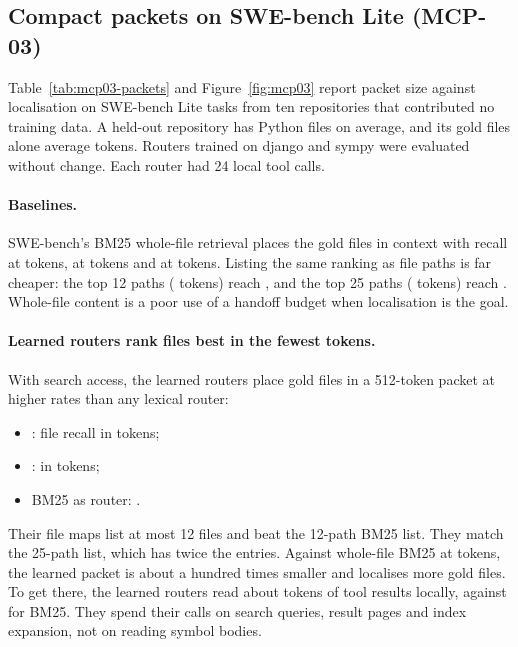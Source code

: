 \subsection{Compact packets on SWE-bench Lite (MCP-03)}
Table~\ref{tab:mcp03-packets} and Figure~\ref{fig:mcp03} report packet size against localisation on
\McpThreeInstances{} SWE-bench Lite tasks from ten repositories that contributed no training data. A held-out
repository has \RepoPythonFiles{} Python files on average, and its gold files alone average \GoldFilesTokens{} tokens.
Routers trained on django and sympy were evaluated without change. Each router had 24 local tool calls.

\paragraph{Baselines.} SWE-bench's BM25 whole-file retrieval places the gold files in context with recall
\BmFilesRecallTwo{} at \BmFilesTokensTwo{} tokens, \BmFilesRecallThirteen{} at \BmFilesTokensThirteen{} tokens and
\BmFilesRecallTwentySeven{} at \BmFilesTokensTwentySeven{} tokens. Listing the same ranking as file paths is far
cheaper: the top 12 paths (\BmMapTokensTwelve{} tokens) reach \BmMapRecallTwelve{}, and the top 25 paths
(\BmMapTokensTwentyFive{} tokens) reach \BmMapRecallTwentyFive{}. Whole-file content is a poor use of a handoff
budget when localisation is the goal.

\paragraph{Learned routers rank files best in the fewest tokens.} With search access, the learned routers place gold
files in a 512-token packet at higher rates than any lexical router:
\begin{itemize}
\item \texttt{\CompactFirstRouter}: file recall \CompactFirstFileRecall{} in \CompactFirstTokens{} tokens;
\item \texttt{\CompactSecondRouter}: \CompactSecondFileRecall{} in \CompactSecondTokens{} tokens;
\item BM25 as router: \BmRouterFileRecallFiveTwelve{}.
\end{itemize}
Their file maps list at most 12 files and beat the 12-path BM25 list. They match the 25-path list, which has twice the
entries. Against whole-file BM25 at \BmFilesTokensTwentySeven{} tokens, the learned packet is about a hundred times smaller
and localises more gold files. To get there, the learned routers read about \LearnedLocalTokens{} tokens of tool results
locally, against \BmRouterLocalTokens{} for BM25. They spend their calls on search queries, result pages and index
expansion, not on reading symbol bodies.

